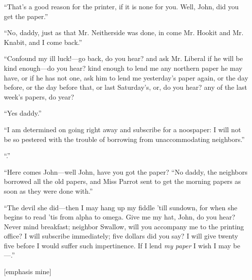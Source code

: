 \begin{ipquote}
“That’s a good reason for the printer, if it is none for you. Well, John, did you get the paper.”

“No, daddy, just as that Mr. Neitherside was done, in come Mr. Hookit and Mr. Knabit, and I come back.”

“Confound my ill luck!—go back, do you hear? and ask Mr. Liberal if he will be kind enough—do you hear? kind enough to lend me any northern paper he may have, or if he has not one, ask him to lend me yesterday’s paper again, or the day before, or the day before that, or last Saturday’s, or, do you hear? any of the last week’s papers, do year?

“Yes daddy.”

“I am determined on going right away and subscribe for a noospaper: I will not be so pestered with the trouble of borrowing from unaccommodating neighbors.”

“.”

“Here comes John—well John, have you got the paper? “No daddy, the neighbors borrowed all the old papers, and Miss Parrot sent to get the morning papers as soon as they were done with.”

{“The devil she did—then I may hang up my fiddle ’till sundown, for when she begins to read ’tis from alpha to omega. Give me my hat, John, do you hear? Never mind breakfast; neighbor Swallow, will you accompany me to the printing office? I will subscribe immediately; five dollars did you say? I will give twenty five before I would suffer such impertinence. If I lend \textit{my paper} I wish I may be—.”

\raggedleft
{[emphasis mine]}\\
}
\end{ipquote}

